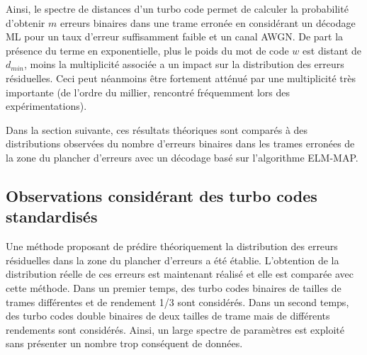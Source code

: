 Ainsi, le spectre de distances d'un turbo code permet de calculer la probabilité 
d'obtenir $m$ erreurs binaires dans une trame erronée en considérant un décodage ML pour un taux d'erreur suffisamment 
faible et un canal AWGN. De part la présence du terme en exponentielle, plus le poids du mot de code $w$ est distant 
de $d_{min}$, moins la multiplicité associée a un impact sur la distribution des erreurs résiduelles. Ceci peut néanmoins
être fortement atténué par une multiplicité très importante (de l'ordre du millier, rencontré fréquemment lors des 
expérimentations).

Dans la section suivante, ces résultats théoriques sont comparés à des distributions observées du nombre d'erreurs binaires dans les
trames erronées de la zone du plancher d'erreurs avec un décodage basé sur l'algorithme ELM-MAP.

\subsection{Observations considérant des turbo codes standardisés}
Une méthode proposant de prédire théoriquement la distribution des erreurs résiduelles dans la zone du plancher d'erreurs 
a été  établie. L'obtention 
de la distribution réelle de ces erreurs est maintenant réalisé et elle est comparée avec cette méthode. Dans un premier 
temps, des turbo codes binaires de tailles de 
trames différentes et de rendement 1/3 sont considérés. Dans un second temps, des turbo codes double binaires de deux
tailles de trame mais de différents rendements sont considérés. Ainsi, un large spectre de paramètres est exploité sans
présenter un nombre trop conséquent de données.

